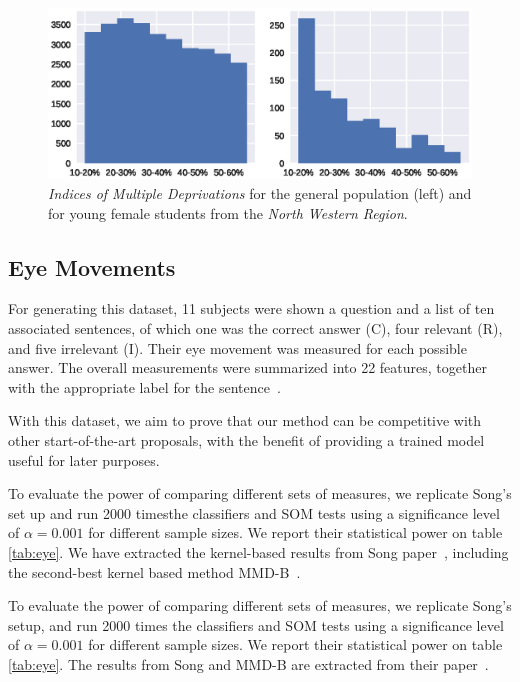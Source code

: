 \begin{figure}[htbp]
    \centering
    \includegraphics[width=\textwidth]{images/6_som/imd_histogram.eps}
    \caption[Histogram of the Indices of Multiple Deprivations for two populations]{
        \emph{Indices of Multiple Deprivations} for the general population (left) and for
        young female students from the \emph{North Western Region}.
    }
    \label{fig:oulad_hist}
\end{figure}

\subsection{Eye Movements}
\label{subsec:som_eye}
For generating this dataset, 11 subjects were shown a question and a list of ten 
associated sentences, of which one was the correct answer (C), four relevant (R), and five
irrelevant (I). Their eye movement was measured for each possible answer.
The overall measurements were summarized into 22 features, together with the
appropriate label for the sentence~\cite{salojarvi2005inferring}.

With this dataset, we aim to prove that our method can be competitive with other
start-of-the-art proposals, with the benefit of providing a trained model useful for
later purposes.

To evaluate the power of comparing different sets of measures, we replicate Song's
set up and run 2000 times\footnotemark the classifiers and \gls{SOM}  tests using a significance
level of $\alpha = 0.001$ for different sample sizes.
We report their statistical power on table \ref{tab:eye}. We have extracted the kernel-based
results from Song \etal paper~\cite{song2021fast}, including the second-best kernel
based method MMD-B~\cite{zaremba2013b}.

To evaluate the power of comparing different sets of measures, we replicate
Song's setup, and run 2000 times the classifiers and \gls{SOM}  tests
using a significance level of $\alpha = 0.001$ for different sample sizes.
We report their statistical power on table \ref{tab:eye}. The results from Song and
MMD-B are extracted from their paper~\cite{song2021fast}.

